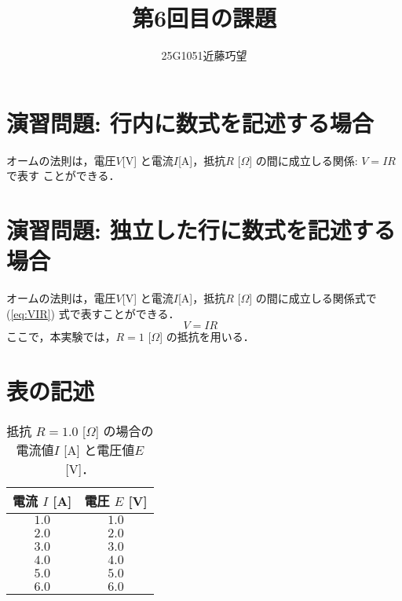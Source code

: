 \documentclass[uplatex]{jsarticle}
\begin{document}
\title{第6回目の課題}
\author{25G1051近藤巧望}
\maketitle


\section{演習問題: 行内に数式を記述する場合}
オームの法則は，電圧$V$[V] と電流$I$[A]，抵抗$R$ [$\Omega$] の間に成立しる関係: $V=IR$で表す
ことができる．
\section{演習問題: 独立した行に数式を記述する場合}
オームの法則は，電圧$V$[V] と電流$I$[A]，抵抗$R$ [$\Omega$] の間に成立しる関係式で
(\ref{eq:VIR}) 式で表すことができる．\\
\begin{equation}
V=IR~~~\label{eq:VIR}
\end{equation}
ここで，本実験では，$R=1$ [$\Omega$] の抵抗を用いる．

\section{表の記述}

\begin{table}[htb]
\centering
\caption{抵抗 $R=1.0$ [$\Omega$] の場合の電流値$I$ [A] と電圧値$E$ [V]．}
\label{table:EVR1}
\begin{tabular}{cc}
\hline
電流 $I$ [A] & 電圧 $E$ [V]\\\hline\hline
$1.0$ & $1.0$ \\\hline
$2.0$ & $2.0$ \\\hline
$3.0$ & $3.0$ \\\hline
$4.0$ & $4.0$ \\\hline
$5.0$ & $5.0$ \\\hline
$6.0$ & $6.0$ \\\hline
\end{tabular}
\end{table}
\end{document}
